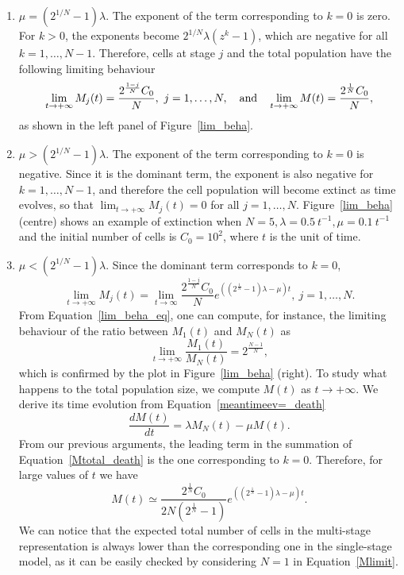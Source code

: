 \documentclass[10pt]{article}
\numberwithin{equation}{section}
\begin{document}
\begin{enumerate}

\item{$\mu = (2^{1/N}-1)\lambda$}. The exponent of the term corresponding to $k=0$ is zero. For $k>0$, the exponents become $2^{1/N} \lambda (z^k-1)$, which are negative for all $k=1,\ldots,N-1$. Therefore, cells at stage $j$ and the total population have the following limiting behaviour
\begin{equation*}
        \lim_{t \to + \infty} M_j(t) = \frac{2^{\frac{1-j}{N}} C_0}{N}, \ j=1,\ldots,N, \quad
        \hbox{and} 
        \quad \lim_{t \to + \infty} M(t) = \frac{2^{\frac{1}{N}} C_0}{N},
\end{equation*}
as shown in the left panel of Figure~\ref{lim_beha}.

\item{$\mu > (2^{1/N}-1)\lambda$}. The exponent of the term corresponding to $k=0$ is negative. Since it is the dominant term, the exponent is also negative for $k = 1,  \ldots,  N-1$, and therefore the cell population will become extinct as time evolves, so that $\lim_{t\to + \infty} M_j(t) = 0$ for all $j=1,\ldots,N$. Figure~\ref{lim_beha} (centre) shows an example of extinction when $N=5, \lambda=0.5 \ t^{-1}, \mu = 0.1 \ t^{-1}$ and the initial number of cells is $C_0=10^2$, where $t$ is the unit of time.

\item{$\mu < (2^{1/N}-1)\lambda$}. Since the dominant term corresponds to $k=0$,
\begin{equation} \label{lim_beha_eq}
\lim_{t \to +\infty} M_j(t) = \lim_{t \to \infty} \frac{2^{\frac{1-j}{N}} C_0}{N} e^{\left((2^{\frac{1}{N}}-1)\lambda - \mu\right)t}, \ j=1,\ldots,N.
\end{equation}
From Equation~\eqref{lim_beha_eq}, one can compute, for instance, the limiting behaviour of the ratio between $M_1(t)$ and $M_N(t)$ as
\begin{equation} 
\label{ratio}
\lim_{t \to +\infty} \frac{M_1(t)}{M_N(t)} = 2^{\frac{N-1}{N}},
\end{equation}
which is confirmed by the plot in Figure~\ref{lim_beha} (right).
To study what happens to the total population size, we compute $M(t)$ as $t \to + \infty$. We derive its time evolution  from Equation~\eqref{meantimeev=_death}
\begin{equation} \label{Mderivative_death}
\frac{dM(t)}{dt} = \lambda M_N(t) - \mu M(t).
\end{equation} 
From our previous arguments, the leading term in the summation of Equation~\eqref{Mtotal_death} is the one corresponding to $k=0$. Therefore, for large values of $t$ we have
\begin{equation} \label{Mlimit}
M(t) \simeq  
\frac{2^{\frac{1}{N}}C_0}{2N \left(2^{\frac{1}{N}}-1\right)} e^{\left(\left(2^{\frac{1}{N}} -1 \right) \lambda - \mu \right)t}.
\end{equation} 
We can notice that the expected total number of cells in the multi-stage representation is always lower than the corresponding one in the single-stage model, as it can be easily checked by considering $N=1$ in Equation~\eqref{Mlimit}.
\end{enumerate}
\end{document}
